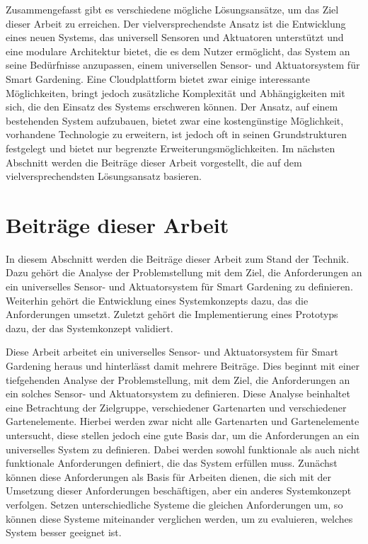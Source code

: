 Zusammengefasst gibt es verschiedene mögliche Lösungsansätze, um das Ziel dieser Arbeit zu erreichen.
Der vielversprechendste Ansatz ist die Entwicklung eines neuen Systems, das universell Sensoren und Aktuatoren unterstützt und eine modulare Architektur bietet, die es dem Nutzer ermöglicht, das System an seine Bedürfnisse anzupassen, einem universellen Sensor- und Aktuatorsystem für Smart Gardening.
Eine Cloudplattform bietet zwar einige interessante Möglichkeiten, bringt jedoch zusätzliche Komplexität und Abhängigkeiten mit sich, die den Einsatz des Systems erschweren können.
Der Ansatz, auf einem bestehenden System aufzubauen, bietet zwar eine kostengünstige Möglichkeit, vorhandene Technologie zu erweitern, ist jedoch oft in seinen Grundstrukturen festgelegt und bietet nur begrenzte Erweiterungsmöglichkeiten.
Im nächsten Abschnitt werden die Beiträge dieser Arbeit vorgestellt, die auf dem vielversprechendsten Lösungsansatz basieren.



\section{Beiträge dieser Arbeit}
In diesem Abschnitt werden die Beiträge dieser Arbeit zum Stand der Technik.
Dazu gehört die Analyse der Problemstellung mit dem Ziel, die Anforderungen an ein universelles Sensor- und Aktuatorsystem für Smart Gardening zu definieren.
Weiterhin gehört die Entwicklung eines Systemkonzepts dazu, das die Anforderungen umsetzt.
Zuletzt gehört die Implementierung eines Prototyps dazu, der das Systemkonzept validiert.

Diese Arbeit arbeitet ein universelles Sensor- und Aktuatorsystem für Smart Gardening heraus und hinterlässt damit mehrere Beiträge.
Dies beginnt mit einer tiefgehenden Analyse der Problemstellung, mit dem Ziel, die Anforderungen an ein solches Sensor- und Aktuatorsystem zu definieren.
Diese Analyse beinhaltet eine Betrachtung der Zielgruppe, verschiedener Gartenarten und verschiedener Gartenelemente.
Hierbei werden zwar nicht alle Gartenarten und Gartenelemente untersucht, diese stellen jedoch eine gute Basis dar, um die Anforderungen an ein universelles System zu definieren.
Dabei werden sowohl funktionale als auch nicht funktionale Anforderungen definiert, die das System erfüllen muss.
Zunächst können diese Anforderungen als Basis für Arbeiten dienen, die sich mit der Umsetzung dieser Anforderungen beschäftigen, aber ein anderes Systemkonzept verfolgen.
Setzen unterschiedliche Systeme die gleichen Anforderungen um, so können diese Systeme miteinander verglichen werden, um zu evaluieren, welches System besser geeignet ist.


